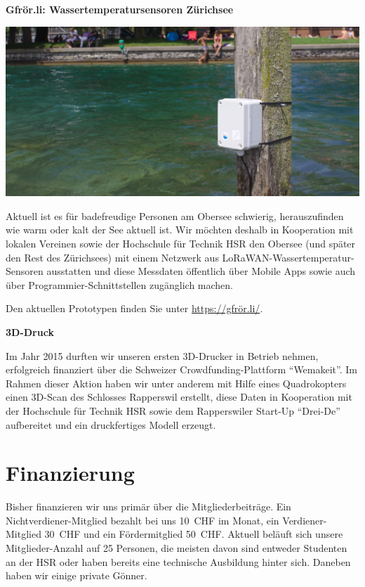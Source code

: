 \documentclass[10pt,a4paper,parskip,fleqn]{scrartcl}
\newcommand{\membercount}{25}
\begin{document}
\textbf{Gfrör.li: Wassertemperatursensoren Zürichsee}

\includegraphics[width=\textwidth]{img/gfroerli.jpg}

Aktuell ist es für badefreudige Personen am Obersee schwierig, herauszufinden
wie warm oder kalt der See aktuell ist. Wir möchten deshalb in Kooperation mit
lokalen Vereinen sowie der Hochschule für Technik HSR den Obersee (und später
den Rest des Zürichsees) mit einem Netzwerk aus
LoRaWAN-Wassertemperatur-Sensoren ausstatten und diese Messdaten öffentlich über
Mobile Apps sowie auch über Programmier-Schnittstellen zugänglich machen.

Den aktuellen Prototypen finden Sie unter \url{https://gfrör.li/}.

\textbf{3D-Druck}

Im Jahr 2015 durften wir unseren ersten 3D-Drucker in Betrieb nehmen,
erfolgreich finanziert über die Schweizer Crowdfunding-Plattform ``Wemakeit''.
Im Rahmen dieser Aktion haben wir unter anderem mit Hilfe eines Quadrokopters
einen 3D-Scan des Schlosses Rapperswil erstellt, diese Daten in Kooperation mit
der Hochschule für Technik HSR sowie dem Rapperswiler Start-Up ``Drei-De''
aufbereitet und ein druckfertiges Modell erzeugt.

\section{Finanzierung}

Bisher finanzieren wir uns primär über die Mitgliederbeiträge. Ein
Nichtverdiener-Mitglied bezahlt bei uns 10~CHF im Monat, ein Verdiener-Mitglied
30~CHF und ein Fördermitglied 50~CHF. Aktuell beläuft sich unsere
Mitglieder-Anzahl auf \membercount{} Personen, die meisten davon sind entweder
Studenten an der HSR oder haben bereits eine technische Ausbildung hinter sich.
Daneben haben wir einige private Gönner.
\end{document}
